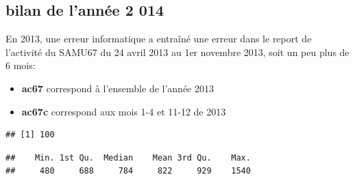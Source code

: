 \documentclass[]{article}
\newenvironment{Shaded}{\begin{snugshade}}{\end{snugshade}}
\newcommand{\KeywordTok}[1]{\textcolor[rgb]{0.13,0.29,0.53}{\textbf{{#1}}}}
\newcommand{\DataTypeTok}[1]{\textcolor[rgb]{0.13,0.29,0.53}{{#1}}}
\newcommand{\DecValTok}[1]{\textcolor[rgb]{0.00,0.00,0.81}{{#1}}}
\newcommand{\StringTok}[1]{\textcolor[rgb]{0.31,0.60,0.02}{{#1}}}
\newcommand{\CommentTok}[1]{\textcolor[rgb]{0.56,0.35,0.01}{\textit{{#1}}}}
\newcommand{\NormalTok}[1]{{#1}}
\begin{document}
\subsection{bilan de l'année 2 014}\label{bilan-de-lannee-2-014}

En 2013, une erreur informatique a entraîné une erreur dans le report de
l'activité du SAMU67 du 24 avril 2013 au 1er novembre 2013, soit un peu
plus de 6 mois:

\begin{itemize}
\itemsep1pt\parskip0pt
\item
  \textbf{ac67} correspond à l'ensemble de l'année 2013
\item
  \textbf{ac67c} correspond aux mois 1-4 et 11-12 de 2013
\end{itemize}

\begin{Shaded}
\end{Shaded}

\begin{verbatim}
## [1] 100
\end{verbatim}

\begin{Shaded}
\end{Shaded}

\begin{verbatim}
##    Min. 1st Qu.  Median    Mean 3rd Qu.    Max. 
##     480     688     784     822     929    1540
\end{verbatim}

\begin{Shaded}
\end{Shaded}
\end{document}
